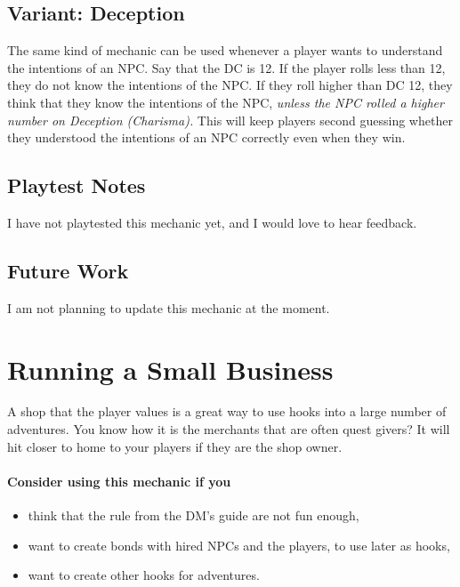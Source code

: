 \documentclass[twocolumn]{dndbook}
\begin{document}
\subsection{Variant: Deception}

The same kind of mechanic can be used whenever a player wants to understand the intentions of an NPC.
Say that the DC is 12. If the player rolls less than 12, they do not know the intentions of the NPC.
If they roll higher than DC 12, they think that they know the intentions of the NPC, \emph{unless the NPC rolled a higher number on Deception (Charisma).}
This will keep players second guessing whether they understood the intentions of an NPC correctly even when they win.\par

\subsection{Playtest Notes}

I have not playtested this mechanic yet, and I would love to hear feedback.

\subsection{Future Work}

I am not planning to update this mechanic at the moment.


\section{Running a Small Business}

\begin{emphasisParagraph}
	A shop that the player values is a great way to use hooks into a large number of adventures.
	You know how it is the merchants that are often quest givers?
	It will hit closer to home to your players if they are the shop owner.
	\paragraph*{Consider using this mechanic if you}
	\begin{itemize}
    \item think that the rule from the DM's guide are not fun enough,
    \item want to create bonds with hired NPCs and the players, to use later as hooks,
    \item want to create other hooks for adventures.
    \end{itemize}
\end{emphasisParagraph}
\end{document}
